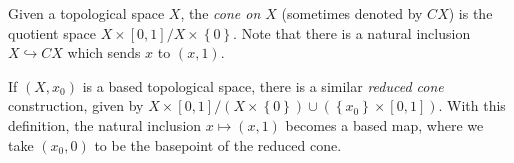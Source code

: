 \documentclass[12pt]{article}
\newcommand{\set}[1]{\left\{#1\right\}}
\newcommand{\cross}{\times}
\begin{document}
Given a topological space $X$, the {\em cone on $X$} (sometimes denoted by $CX$) is the quotient space $X\cross [0,1]/X\cross\set{0}.$ Note that there is a natural inclusion $X\hookrightarrow CX$ which sends $x$ to $(x,1).$ 

If $(X,x_0)$ is a based topological space, there is a similar {\em reduced cone} construction, given by $X\cross [0,1] / (X\cross\set{0})\cup(\set{x_0}\cross[0,1]).$ With this definition, the natural inclusion $x\mapsto (x,1)$ becomes a based map, where we take $(x_0,0)$ to be the basepoint of the reduced cone.
\end{document}
